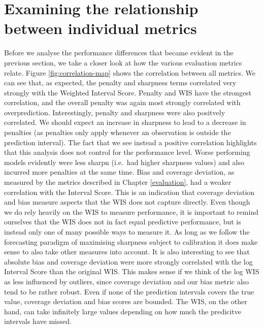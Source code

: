 \documentclass[
]{book}
\begin{document}
\hypertarget{relationship}{%
\section{Examining the relationship between individual metrics}\label{relationship}}

Before we analyse the performance differences that became evident in the previous section, we take a closer look at how the various evaluation metrics relate. Figure \ref{fig:correlation-map} shows the correlation between all metrics. We can see that, as expected, the penalty and sharpness terms correlated very strongly with the Weighted Interval Score. Penalty and WIS have the strongest correlation, and the overall penalty was again most strongly correlated with overprediction. Interestingly, penalty and sharpness were also positvely correlated. We should expect an increase in sharpness to lead to a decrease in penalties (as penalties only apply whenever an observation is outside the prediction interval). The fact that we see instead a positive correlation highlights that this analysis does not control for the performance level. Worse performing models evidently were less sharpn (i.e.~had higher sharpness values) and also incurred more penalties at the same time. Bias and coverage deviation, as measured by the metrics described in Chapter \ref{evaluation}, had a weaker correlation with the Interval Score. This is an indication that coverage deviation and bias measure aspects that the WIS does not capture directly. Even though we do rely heavily on the WIS to measure performance, it is important to remind ourselves that the WIS does not in fact equal predictive performance, but is instead only one of many possible ways to measure it. As long as we follow the forecasting paradigm of maximising sharpness subject to calibration it does make sense to also take other measures into account. It is also interesting to see that absolute bias and coverage deviation were more strongly correlated with the log Interval Score than the original WIS. This makes sense if we think of the log WIS as less influenced by outliers, since coverage deviation and our bias metric also tend to be rather robust. Even if none of the prediction intervals covers the true value, coverage deviation and bias scores are bounded. The WIS, on the other hand, can take infinitely large values depending on how much the predicitve intervals have missed.
\end{document}
